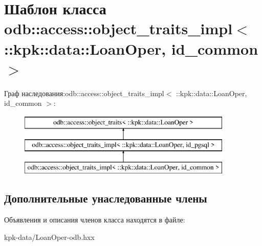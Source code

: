 \hypertarget{classodb_1_1access_1_1object__traits__impl_3_01_1_1kpk_1_1data_1_1_loan_oper_00_01id__common_01_4}{}\section{Шаблон класса odb\+:\+:access\+:\+:object\+\_\+traits\+\_\+impl$<$ \+:\+:kpk\+:\+:data\+:\+:Loan\+Oper, id\+\_\+common $>$}
\label{classodb_1_1access_1_1object__traits__impl_3_01_1_1kpk_1_1data_1_1_loan_oper_00_01id__common_01_4}
Граф наследования\+:odb\+:\+:access\+:\+:object\+\_\+traits\+\_\+impl$<$ \+:\+:kpk\+:\+:data\+:\+:Loan\+Oper, id\+\_\+common $>$\+:\begin{figure}[H]
\begin{center}
\leavevmode
\includegraphics[height=3.000000cm]{classodb_1_1access_1_1object__traits__impl_3_01_1_1kpk_1_1data_1_1_loan_oper_00_01id__common_01_4}
\end{center}
\end{figure}
\subsection*{Дополнительные унаследованные члены}


Объявления и описания членов класса находятся в файле\+:\begin{DoxyCompactItemize}
\item 
kpk-\/data/Loan\+Oper-\/odb.\+hxx\end{DoxyCompactItemize}
